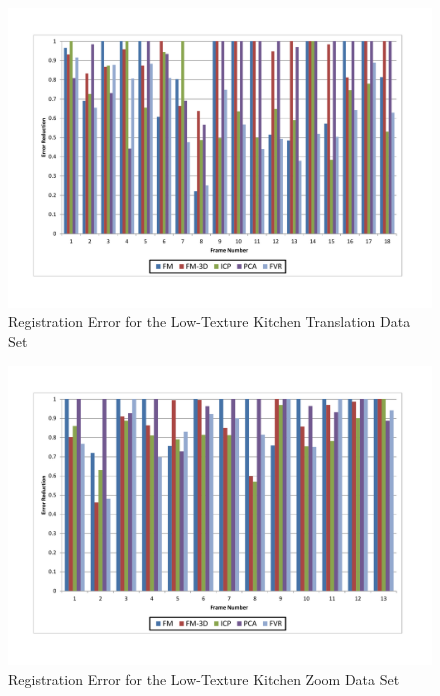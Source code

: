 \begin{figure}[t]
\centering
\includegraphics[width=6.0in]{images/results/Kitchen_LittleTexture_Pan}
\caption{Registration Error for the Low-Texture Kitchen Translation Data Set}
\label{fig:PET6}
\end{figure}

\begin{figure}[t]
\centering
\includegraphics[width=6.0in]{images/results/Kitchen_Little_Texture_Zoom}
\caption{Registration Error for the Low-Texture Kitchen Zoom Data Set}
\label{fig:PET7}
\end{figure}

